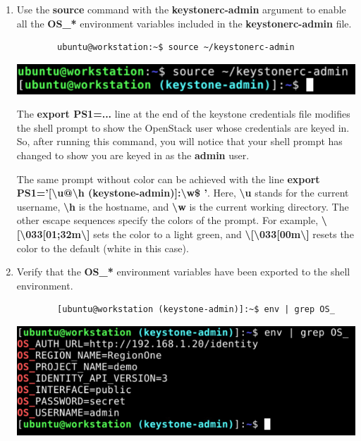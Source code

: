 \documentclass[letterpaper, 12pt]{article}
\begin{document}
\begin{enumerate}
    \item Use the \textbf{source} command with the \textbf{keystonerc-admin} argument to enable all the
    \textbf{OS\_*} environment variables included in the \textbf{keystonerc-admin} file.
    \begin{lstlisting}
        ubuntu@workstation:~$ source ~/keystonerc-admin
    \end{lstlisting}

    \begin{center}
        \includegraphics[width=\linewidth]{images/part2/step3.png}
    \end{center}
        
    \begin{notebox}
        The \textbf{export PS1=...} line at the end of the keystone credentials file modifies the shell prompt to show
        the OpenStack user whose credentials are keyed in. So, after running this command, you will notice that your
        shell prompt has changed to show you are keyed in as the \textbf{admin} user.
    \end{notebox}

    \begin{notebox}
        The same prompt without color can be achieved with the line
        \textbf{export PS1='[\textbackslash u@\textbackslash h (keystone-admin)]:\textbackslash w\$ '}. Here,
        \textbf{\textbackslash u} stands for the current username, \textbf{\textbackslash h} is the hostname, and
        \textbf{\textbackslash w} is the current working directory. The other escape sequences specify the colors of the
        prompt. For example, \textbf{\textbackslash[\textbackslash 033[01;32m\textbackslash]} sets the color to a light
        green, and \textbf{\textbackslash[\textbackslash 033[00m\textbackslash]} resets the color to the default
        (white in this case).
    \end{notebox}

    \item Verify that the \textbf{OS\_*} environment variables have been exported to the shell environment.
    \begin{lstlisting}
        [ubuntu@workstation (keystone-admin)]:~$ env | grep OS_
    \end{lstlisting}

    \begin{center}
        \includegraphics[width=\linewidth]{images/part2/step4.png}
    \end{center}


\end{enumerate}
\end{document}
